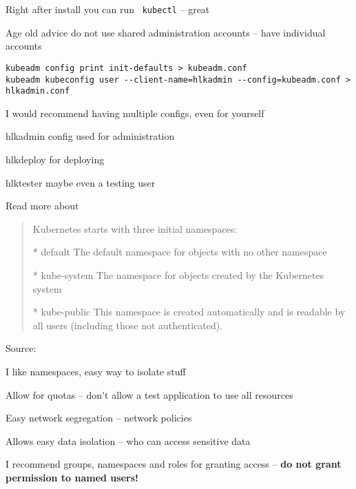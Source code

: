 \documentclass[Screen16to9,17pt]{foils}
\begin{document}
\begin{list2}
\item Right after install you can run \faWrench\ \verb+kubectl+ -- great
\item Age old advice do not use shared administration accounts -- have individual accounts
\end{list2}



\begin{verbatim}
kubeadm config print init-defaults > kubeadm.conf
kubeadm kubeconfig user --client-name=hlkadmin --config=kubeadm.conf > hlkadmin.conf
\end{verbatim}

\begin{list2}
\item I would recommend having multiple configs, even for yourself
\item hlkadmin config used for administration
\item hlkdeploy for deploying
\item hlktester maybe even a testing user
\item Read more about 
\end{list2}


\begin{quote}
Kubernetes starts with three initial namespaces:
\begin{list2}
\item[*] default The default namespace for objects with no other namespace
\item[*] kube-system The namespace for objects created by the Kubernetes system
\item[*] kube-public This namespace is created automatically and is readable by all users (including those not authenticated).
\end{list2}
\end{quote}
Source: 

\begin{list2}
\item I like namespaces, easy way to isolate stuff
\item Allow for quotas -- don't allow a test application to use all resources
\item Easy network segregation -- network policies
\item Allows easy data isolation -- who can access sensitive data
\item I recommend groups, namespaces and roles for granting access -- {\bf do not grant permission to named users!}
\end{list2}
\end{document}

